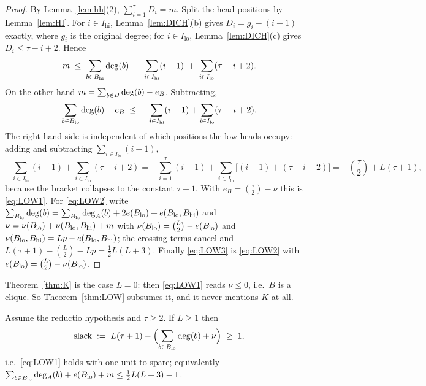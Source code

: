\begin{proof}
By Lemma~\ref{lem:hh}(2), $\sum_{i=1}^{\tau} D_i = m$. Split the head positions by
Lemma~\ref{lem:HI}. For $i \in I_{\mathrm{hi}}$, Lemma~\ref{lem:DICH}(b) gives
$D_i = g_i - (i-1)$ exactly, where $g_i$ is the original degree; for
$i \in I_{\mathrm{lo}}$, Lemma~\ref{lem:DICH}(c) gives $D_i \le \tau - i + 2$. Hence
\[
m \;\le\; \sum_{b \in B_{\mathrm{hi}}} \mathrm{deg}(b) \;-\; \sum_{i \in I_{\mathrm{hi}}}(i-1)
\;+\; \sum_{i \in I_{\mathrm{lo}}}(\tau - i + 2).
\]
On the other hand $m = \sum_{b \in B}\mathrm{deg}(b) - e_B$. Subtracting,
\[
\sum_{b \in B_{\mathrm{lo}}}\mathrm{deg}(b) - e_B \;\le\;
- \sum_{i \in I_{\mathrm{hi}}}(i-1) + \sum_{i \in I_{\mathrm{lo}}}(\tau-i+2).
\]
The right-hand side is independent of which positions the low heads occupy: adding and
subtracting $\sum_{i \in I_{\mathrm{lo}}}(i-1)$,
\[
- \sum_{i \in I_{\mathrm{hi}}}(i-1) + \sum_{i \in I_{\mathrm{lo}}}(\tau-i+2)
= - \sum_{i=1}^{\tau}(i-1) + \sum_{i \in I_{\mathrm{lo}}}\bigl[(i-1)+(\tau-i+2)\bigr]
= - \binom{\tau}{2} + L(\tau+1),
\]
because the bracket collapses to the constant $\tau+1$. With $e_B = \binom{\tau}{2} - \nu$
this is \eqref{eq:LOW1}. For \eqref{eq:LOW2} write
$\sum_{B_{\mathrm{lo}}}\mathrm{deg}(b) = \sum_{B_{\mathrm{lo}}}\mathrm{deg}_A(b) + 2e(B_{\mathrm{lo}}) + e(B_{\mathrm{lo}},B_{\mathrm{hi}})$ and
$\nu = \nu(B_{\mathrm{lo}}) + \nu(B_{\mathrm{lo}},B_{\mathrm{hi}}) + \bar{m}$ with
$\nu(B_{\mathrm{lo}}) = \binom{L}{2} - e(B_{\mathrm{lo}})$ and $\nu(B_{\mathrm{lo}},B_{\mathrm{hi}}) = Lp - e(B_{\mathrm{lo}},B_{\mathrm{hi}})$; the crossing
terms cancel and $L(\tau+1) - \binom{L}{2} - Lp = \tfrac12 L(L+3)$. Finally \eqref{eq:LOW3}
is \eqref{eq:LOW2} with $e(B_{\mathrm{lo}}) = \binom{L}{2} - \nu(B_{\mathrm{lo}})$.
\end{proof}

Theorem~\ref{thm:K} is the case $L = 0$: then \eqref{eq:LOW1} reads $\nu \le 0$, i.e.\ $B$
is a clique. So Theorem~\ref{thm:LOW} subsumes it, and it never mentions $K$ at all.

\begin{theorem}\label{thm:SL}
Assume the reductio hypothesis and $\tau \ge 2$. If $L \ge 1$ then
\[
\mathrm{slack} \;:=\; L(\tau+1) - \Bigl( \sum_{b \in B_{\mathrm{lo}}}\mathrm{deg}(b) + \nu \Bigr) \;\ge\; 1,
\]
i.e.\ \eqref{eq:LOW1} holds with one unit to spare; equivalently
$\sum_{b\in B_{\mathrm{lo}}}\mathrm{deg}_A(b) + e(B_{\mathrm{lo}}) + \bar{m} \le \tfrac12 L(L+3) - 1$.
\end{theorem}

